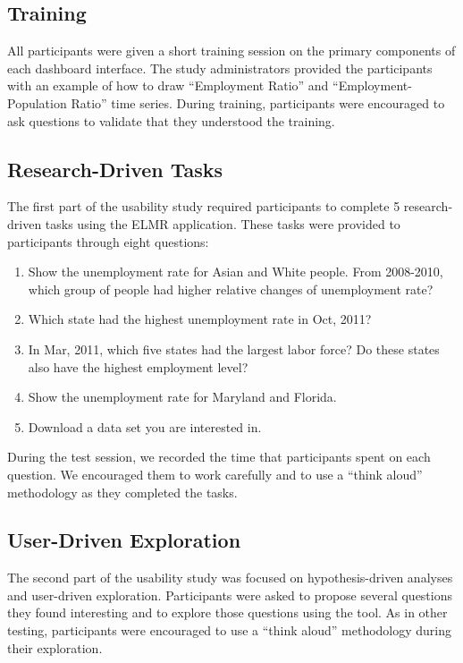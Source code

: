 \documentclass{sigchi}
\begin{document}
\subsection{Training}
All participants were given a short training session on the primary components of each dashboard interface. The study administrators provided the participants with an example of how to draw ``Employment Ratio'' and ``Employment-Population Ratio'' time series. During training, participants were encouraged to ask questions to validate that they understood the training.

\subsection{Research-Driven Tasks}
The first part of the usability study required participants to complete 5 research-driven tasks using the ELMR application. These tasks were provided to participants through eight questions:

\begin{enumerate}
\item    Show the unemployment rate for Asian and White people. From 2008-2010, which group of people had higher relative changes of unemployment rate?

\item    Which state had the highest unemployment rate in Oct, 2011?
\item    In Mar, 2011, which five states had the largest labor force? Do these states also have the highest employment level?
\item     Show the unemployment rate for Maryland and Florida.
\item     Download a data set you are interested in.
\end{enumerate}

During the test session, we recorded the time that participants spent on each question. We encouraged them to work carefully and to use a  ``think aloud'' methodology as they completed the tasks.

\subsection{User-Driven Exploration}
The second part of the usability study was focused on hypothesis-driven analyses and user-driven exploration. Participants were asked to propose several questions they found interesting and to explore those questions using the tool. As in other testing, participants were encouraged to use a ``think aloud'' methodology during their exploration.
\end{document}

